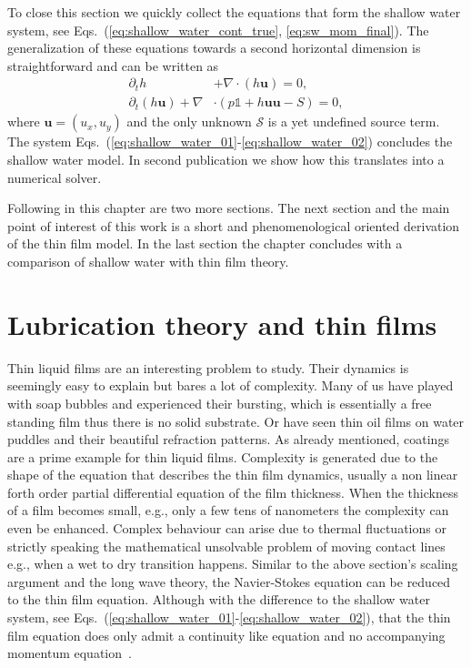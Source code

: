 To close this section we quickly collect the equations that form the shallow water system, see Eqs.~(\ref{eq:shallow_water_cont_true}, \ref{eq:sw_mom_final}).
The generalization of these equations towards a second horizontal dimension is straightforward and can be written as~\cite{salmonLatticeBoltzmannMethod1999, dellarNonhydrodynamicModesPriori2002, thommesLatticeBoltzmannMethods2007}
\begin{align}    
        \partial_t h &+ \nabla \cdot (h\mathbf{u}) = 0, \label{eq:shallow_water_01}\\
        \partial_t (h\mathbf{u}) + \nabla&\cdot (p \mathbb{1} + h\mathbf{u}\mathbf{u} - S) = 0, \label{eq:shallow_water_02} 
\end{align}
where $\mathbf{u} = (u_x, u_y)$ and the only unknown $\mathcal{S}$ is a yet undefined source term. 
The system Eqs.~(\ref{eq:shallow_water_01}-\ref{eq:shallow_water_02}) concludes the shallow water model. 
In second publication we show how this translates into a numerical solver.

Following in this chapter are two more sections.
The next section and the main point of interest of this work is a short and phenomenological oriented derivation of the thin film model.
In the last section the chapter concludes with a comparison of shallow water with thin film theory.

\section{Lubrication theory and thin films}
\label{sec:thin_films}
Thin liquid films are an interesting problem to study.
Their dynamics is seemingly easy to explain but bares a lot of complexity.
Many of us have played with soap bubbles and experienced their bursting, which is essentially a free standing film thus there is no solid substrate.
Or have seen thin oil films on water puddles and their beautiful refraction patterns.
As already mentioned, coatings are a prime example for thin liquid films. 
Complexity is generated due to the shape of the equation that describes the thin film dynamics, usually a non linear forth order partial differential equation of the film thickness.
When the thickness of a film becomes small, e.g., only a few tens of nanometers the complexity can even be enhanced. 
Complex behaviour can arise due to thermal fluctuations or strictly speaking the mathematical unsolvable problem of moving contact lines e.g., when a wet to dry transition happens.
Similar to the above section's scaling argument and the long wave theory, the Navier-Stokes equation can be reduced to the thin film equation. 
Although with the difference to the shallow water system, see Eqs.~(\ref{eq:shallow_water_01}-\ref{eq:shallow_water_02}), that the thin film equation does only admit a continuity like equation and no accompanying momentum equation~\cite{oronLongscaleEvolutionThin1997, degennesWettingStaticsDynamics1985, crasterDynamicsStabilityThin2009}.

